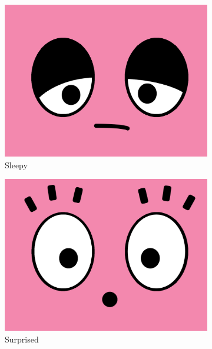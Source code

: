 \documentclass[12pt]{article}
\begin{document}
\begin{figure}[!htbp]
\begin{subfigure}[b]{0.23\textwidth}
    \includegraphics[width=\textwidth]{8.png}
    \caption{Sleepy}
    \label{sleepy}
    \end{subfigure}
    \begin{subfigure}[b]{0.23\textwidth}
    \centering
    \includegraphics[width=\textwidth]{9.png}
    \caption{Surprised}
    \label{surprised}
    \end{subfigure}\\~\\
    \begin{subfigure}[b]{0.45\textwidth}
    \centering

\end{subfigure}
\end{figure}
\end{document}
